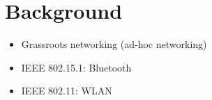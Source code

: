 \section{Background}

\begin{frame}
    \begin{itemize}
        \item Grassroots networking (ad-hoc networking)
        \item IEEE 802.15.1: Bluetooth
        \item IEEE 802.11: WLAN
    \end{itemize}
\end{frame}